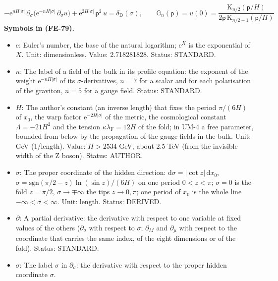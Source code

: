 \documentclass[
  10pt,
]{article}
\providecommand{\tightlist}{%
  \setlength{\itemsep}{0pt}\setlength{\parskip}{0pt}}
\begin{document}
\[
-\mathrm{e}^{nH\lvert\sigma\rvert}\,\partial_\sigma\big(\mathrm{e}^{-nH\lvert\sigma\rvert}\,\partial_\sigma u\big)
 + \mathrm{e}^{2H\lvert\sigma\rvert}\,\mathsf{p}^2\,u = \delta_{\mathrm{D}}(\sigma),\qquad
\mathbb{G}_n(\mathsf{p}) = u(0) = \frac{\mathrm{K}_{n/2}(\mathsf{p}/H)}{2\mathsf{p}\,\mathrm{K}_{n/2-1}(\mathsf{p}/H)} \tag{FE-79}
\] \textbf{Symbols in (FE-79).}

\begin{itemize}
\tightlist
\item
  \(\mathrm{e}\): Euler's number, the base of the natural logarithm;
  \(\mathrm{e}^{X}\) is the exponential of \(X\). Unit: dimensionless.
  Value: 2.718281828. Status: STANDARD.
\item
  \(n\): The label of a field of the bulk in its profile equation: the
  exponent of the weight \(\mathrm{e}^{-nH\lvert\sigma\rvert}\) of its
  \(\sigma\)-derivatives, \(n = 7\) for a scalar and for each
  polarisation of the graviton, \(n = 5\) for a gauge field. Status:
  STANDARD.
\item
  \(H\): The author's constant (an inverse length) that fixes the period
  \(\pi/(6H)\) of \(x_0\), the warp factor
  \(\mathrm{e}^{-2H\lvert\sigma\rvert}\) of the metric, the cosmological
  constant \(\Lambda = -21H^2\) and the tension
  \(\kappa\lambda_{\mathrm{F}} = 12H\) of the fold; in UM-4 a free
  parameter, bounded from below by the propagation of the gauge fields
  in the bulk. Unit: GeV (1/length). Value: \(H > 2534\) GeV, about 2.5
  TeV (from the invisible width of the Z boson). Status: AUTHOR.
\item
  \(\sigma\): The proper coordinate of the hidden direction:
  \(\mathrm{d}\sigma = \lvert\cot z\rvert\,\mathrm{d}x_0\),
  \(\sigma = \mathrm{sgn}(\pi/2 - z)\ln(\sin z)/(6H)\) on one period
  \(0 < z < \pi\); \(\sigma = 0\) is the fold \(z = \pi/2\),
  \(\sigma \to \mp\infty\) the tips \(z \to 0, \pi\); one period of
  \(x_0\) is the whole line \(-\infty < \sigma < \infty\). Unit: length.
  Status: DERIVED.
\item
  \(\partial\): A partial derivative: the derivative with respect to one
  variable at fixed values of the others (\(\partial_\sigma\) with
  respect to \(\sigma\); \(\partial_M\) and \(\partial_\mu\) with
  respect to the coordinate that carries the same index, of the eight
  dimensions or of the fold). Status: STANDARD.
\item
  \(\sigma\): The label \(\sigma\) in \(\partial_\sigma\): the
  derivative with respect to the proper hidden coordinate \(\sigma\).

\end{itemize}
\end{document}
